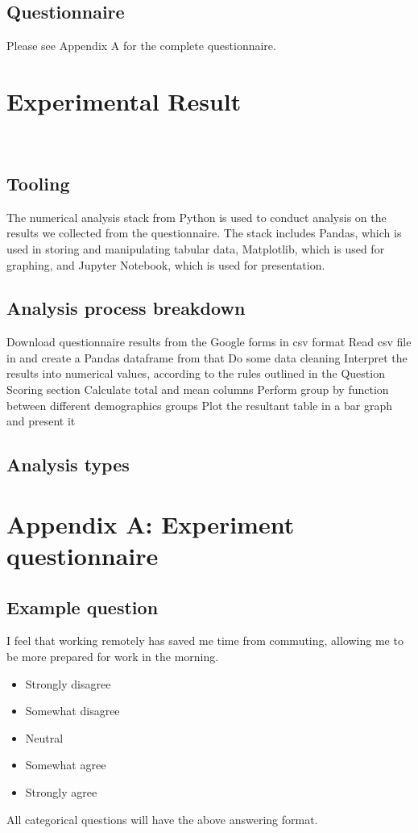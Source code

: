 \documentclass[12pt]{article}
\begin{document}
\subsection*{Questionnaire}
Please see Appendix A for the complete questionnaire.

\section*{Experimental Result}\

\subsection*{Tooling}

The numerical analysis stack from Python is used to conduct analysis on the results we collected from the questionnaire. The stack includes Pandas, which is used in storing and manipulating tabular data, Matplotlib, which is used for graphing, and Jupyter Notebook, which is used for presentation.

\subsection*{Analysis process breakdown}
Download questionnaire results from the Google forms in csv format
Read csv file in and create a Pandas dataframe from that
Do some data cleaning
Interpret the results into numerical values, according to the rules outlined in the Question Scoring section
Calculate total and mean columns
Perform group by function between different demographics groups
Plot the resultant table in a bar graph and present it

\subsection*{Analysis types}





\appendix
\section*{Appendix A: Experiment questionnaire}

\subsection*{Example question}
I feel that working remotely has saved me time from commuting, allowing me to be more prepared for work in the morning. 
\begin{itemize}
  \item Strongly disagree
  \item Somewhat disagree
  \item Neutral
  \item Somewhat agree
  \item Strongly agree
\end{itemize}
All categorical questions will have the above answering format.
\end{document}
